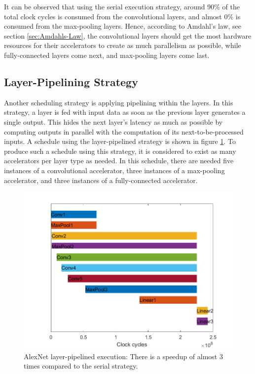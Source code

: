 It can be observed that using the serial execution strategy, around 90\% of the total clock cycles is consumed from the convolutional layers, and almost 0\% is consumed from the max-pooling layers. Hence, according to Amdahl's law, see section \ref{sec:Amdahls-Law}, the convolutional layers should get the most hardware resources for their accelerators to create as much parallelism as possible, while fully-connected layers come next, and max-pooling layers come last.

\subsection{Layer-Pipelining Strategy}
Another scheduling strategy is applying pipelining within the layers. In this strategy, a layer is fed with input data as soon as the previous layer generates a single output. This hides the next layer's latency as much as possible by computing outputs in parallel with the computation of its next-to-be-processed inputs. A schedule using the layer-pipelined strategy is shown in figure \ref{fig:layer-pipelined-execution}. To produce such a schedule using this strategy, it is considered to exist as many accelerators per layer type as needed. In this schedule, there are needed five instances of a convolutional accelerator,  three instances of a max-pooling accelerator, and three instances of a fully-connected accelerator.

\begin{figure} [H]
	\centering
	\includegraphics[width=\textwidth]{../Images/Scheduling/Pipelined-1x.png}
	\decoRule
	\caption[AlexNet layer-pipelined execution]{AlexNet layer-pipelined execution: There is a speedup of almost 3 times compared to the serial strategy.}
	\label{fig:layer-pipelined-execution}
\end{figure}

